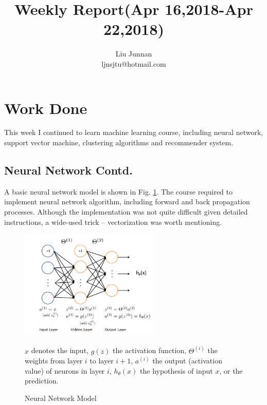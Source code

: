\documentclass{article} %
\title{Weekly Report(Apr 16,2018-Apr 22,2018)}
\author{
Liu Junnan\\
ljnsjtu@hotmail.com
}
\begin{document}
\maketitle

\begin{abstract}

\end{abstract}

\section{Work Done}
This week I continued to learn machine learning course, including neural network, support vector machine, clustering algorithms and recommender system.

\subsection{Neural Network Contd.}
A basic neural network model is shown in Fig. \ref{fig:nnmodel}. The course required to implement neural network algorithm, including forward and back propagation processes. Although the implementation was not quite difficult given detailed instructions, a wide-used trick -- vectorization was worth mentioning.

\begin{figure}[h]
\begin{center}
    \includegraphics[width=0.6\textwidth]{nn-model.png}
\end{center}
\caption{Neural Network Model}
\label{fig:nnmodel}
$x$ denotes the input, $g(z)$ the activation function, $\Theta^{(i)}$ the weights from layer $i$ to layer $i+1$, $a^{(i)}$ the output (activation value) of neurons in layer $i$, $h_\theta(x)$ the hypothesis of input $x$, or the prediction.
\end{figure}
\end{document}
